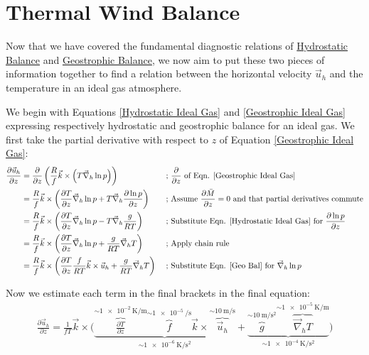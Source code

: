 \section{Thermal Wind Balance}

Now that we have covered the fundamental diagnostic relations of \hyperref[Hydrostatic GFD Box]{Hydrostatic Balance} and \hyperref[Geostrophic Box]{Geostrophic Balance}, we now aim to put these two pieces of information together to find a relation between the horizontal velocity $\vec{u}_h$ and the temperature in an ideal gas atmosphere.

We begin with Equations \ref{Hydrostatic Ideal Gas} and \ref{Geostrophic Ideal Gas} expressing respectively hydrostatic and geostrophic balance for an ideal gas. We first take the partial derivative with respect to $z$ of Equation \ref{Geostrophic Ideal Gas}:
\begin{align*}
    \frac{\partial\vec{u}_h}{\partial z}&=\frac{\partial}{\partial z} \left( \frac{R}{f}\vec{k}\times \left( T\vec{\nabla}_h \ln p \right) \right)
    &
    \text{ ; }
    &
    \frac{\partial}{\partial z}\text{ of Eqn. \ref{Geostrophic Ideal Gas}}
    \\
    &=\frac{R}{f}\vec{k}\times\left( 
        \frac{\partial T}{\partial z}\vec{\nabla}_h \ln p
        +
        T\vec{\nabla}_h \frac{\partial \ln p}{\partial z}
     \right)
    &
    \text{ ; }
    &
    \text{Assume }\frac{\partial \bar{M}}{\partial z}=0\text{ and that partial derivatives commute}
    \\
    &=\frac{R}{f}\vec{k}\times\left( 
        \frac{\partial T}{\partial z}\vec{\nabla}_h \ln p
        -
        T\vec{\nabla}_h \frac{g}{RT}
    \right)
    &
    \text{ ; }
    &
    \text{Substitute Eqn. \ref{Hydrostatic Ideal Gas} for }\frac{\partial \ln p}{\partial z}
    \\
    &=\frac{R}{f}\vec{k}\times\left( 
        \frac{\partial T}{\partial z}\vec{\nabla}_h \ln p
        +
        \frac{g}{RT}
        \vec{\nabla}_h T
    \right)
    &
    \text{ ; }
    &
    \text{Apply chain rule}
    \\
    &=\frac{R}{f}\vec{k}\times\left( 
        \frac{\partial T}{\partial z}\frac{f}{RT} \vec{k}\times\vec{u}_h
        +
        \frac{g}{RT}
        \vec{\nabla}_h T
    \right)
    &
    \text{ ; }
    &
    \text{Substitute Eqn. \ref{Geo Bal} for }\vec{\nabla}_h\ln p
\end{align*}

Now we estimate each term in the final brackets in the final equation:
\begin{align*}
    \frac{\partial \vec{u}_h}{\partial z}=\frac{1}{fT}\vec{k}\times\biggl( 
        \underbrace{\overbrace{\frac{\partial T}{\partial z}}^{\sim\qty{1e-2}{\kelvin\per\meter}}
        \overbrace{f}^{\sim\qty{1e-5}{\per\second}}
        \vec{k}\times
        \overbrace{\vec{u}_h}^{\sim\qty{10}{\meter\per\second}}}_{\sim \qty{1e-6}{\kelvin\per\square\second}}
        +
        \underbrace{\overbrace{g}^{\sim\qty{10}{\meter\per\square\second}}
        \overbrace{\vec{\nabla}_h T}^{\sim\qty{1e-5}{\kelvin\per\meter}}}_{\sim\qty{1e-4}{\kelvin\per\square\second}}
    \biggr)
\end{align*}

